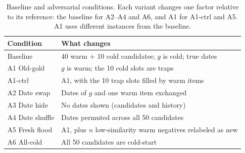 \documentclass[11pt]{article}
\begin{document}
\begin{table}[t]
\centering
\small
\begin{tabularx}{\columnwidth}{@{}l X@{}}
\toprule
\textbf{Condition} & \textbf{What changes} \\
\midrule
Baseline & 40 warm + 10 cold candidates; $g$ is cold; true dates \\
\addlinespace
A1 Old-gold & $g$ is warm; the 10 cold slots are traps \\
A1-ctrl & A1, with the 10 trap slots filled by warm items \\
A2 Date swap & Dates of $g$ and one warm item exchanged \\
A3 Date hide & No dates shown (candidates and history) \\
A4 Date shuffle & Dates permuted across all 50 candidates \\
A5 Fresh flood & A1, plus $n$ low-similarity warm negatives relabeled as new \\
A6 All-cold & All 50 candidates are cold-start \\
\bottomrule
\end{tabularx}
\caption{Baseline and adversarial conditions. Each variant changes one factor relative to its reference: the baseline for A2--A4 and A6, and A1 for A1-ctrl and A5. A1 uses different instances from the baseline.}
\label{tab:conditions}
\end{table}
\end{document}
